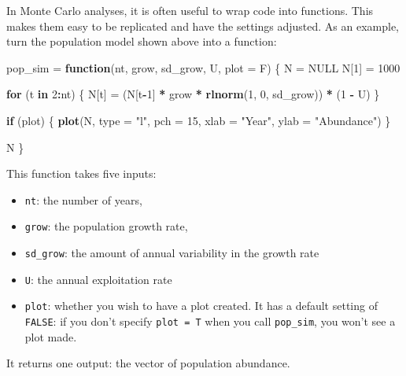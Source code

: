 \documentclass[]{book}
\newenvironment{Shaded}{\begin{snugshade}}{\end{snugshade}}
\newcommand{\KeywordTok}[1]{\textcolor[rgb]{0.13,0.29,0.53}{\textbf{#1}}}
\newcommand{\DataTypeTok}[1]{\textcolor[rgb]{0.13,0.29,0.53}{#1}}
\newcommand{\DecValTok}[1]{\textcolor[rgb]{0.00,0.00,0.81}{#1}}
\newcommand{\StringTok}[1]{\textcolor[rgb]{0.31,0.60,0.02}{#1}}
\newcommand{\OtherTok}[1]{\textcolor[rgb]{0.56,0.35,0.01}{#1}}
\newcommand{\ControlFlowTok}[1]{\textcolor[rgb]{0.13,0.29,0.53}{\textbf{#1}}}
\newcommand{\OperatorTok}[1]{\textcolor[rgb]{0.81,0.36,0.00}{\textbf{#1}}}
\newcommand{\NormalTok}[1]{#1}
\providecommand{\tightlist}{%
  \setlength{\itemsep}{0pt}\setlength{\parskip}{0pt}}
\theoremstyle{definition}
\theoremstyle{definition}
\theoremstyle{definition}
\theoremstyle{remark}
\begin{document}
In Monte Carlo analyses, it is often useful to wrap code into functions.
This makes them easy to be replicated and have the settings adjusted. As
an example, turn the population model shown above into a function:

\begin{Shaded}
\begin{Highlighting}[]
\NormalTok{pop_sim =}\StringTok{ }\ControlFlowTok{function}\NormalTok{(nt, grow, sd_grow, U, }\DataTypeTok{plot =}\NormalTok{ F) \{}
\NormalTok{  N =}\StringTok{ }\OtherTok{NULL} 
\NormalTok{  N[}\DecValTok{1}\NormalTok{] =}\StringTok{ }\DecValTok{1000}

  \ControlFlowTok{for}\NormalTok{ (t }\ControlFlowTok{in} \DecValTok{2}\OperatorTok{:}\NormalTok{nt) \{}
\NormalTok{    N[t] =}\StringTok{ }\NormalTok{(N[t}\OperatorTok{-}\DecValTok{1}\NormalTok{] }\OperatorTok{*}\StringTok{ }\NormalTok{grow }\OperatorTok{*}\StringTok{ }\KeywordTok{rlnorm}\NormalTok{(}\DecValTok{1}\NormalTok{, }\DecValTok{0}\NormalTok{, sd_grow)) }\OperatorTok{*}\StringTok{ }\NormalTok{(}\DecValTok{1} \OperatorTok{-}\StringTok{ }\NormalTok{U)}
\NormalTok{  \}}
  
  \ControlFlowTok{if}\NormalTok{ (plot) \{}
    \KeywordTok{plot}\NormalTok{(N, }\DataTypeTok{type =} \StringTok{"l"}\NormalTok{, }\DataTypeTok{pch =} \DecValTok{15}\NormalTok{, }\DataTypeTok{xlab =} \StringTok{"Year"}\NormalTok{, }\DataTypeTok{ylab =} \StringTok{"Abundance"}\NormalTok{)}
\NormalTok{  \}}
  
\NormalTok{  N}
\NormalTok{\}}
\end{Highlighting}
\end{Shaded}

This function takes five inputs:

\begin{itemize}
\tightlist
\item
  \texttt{nt}: the number of years,
\item
  \texttt{grow}: the population growth rate,
\item
  \texttt{sd\_grow}: the amount of annual variability in the growth rate
\item
  \texttt{U}: the annual exploitation rate
\item
  \texttt{plot}: whether you wish to have a plot created. It has a
  default setting of \texttt{FALSE}: if you don't specify
  \texttt{plot\ =\ T} when you call \texttt{pop\_sim}, you won't see a
  plot made.
\end{itemize}

It returns one output: the vector of population abundance.
\end{document}
